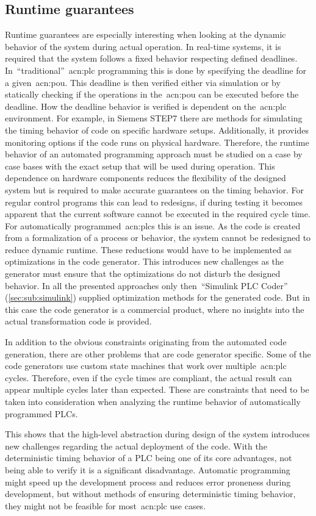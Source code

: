 \subsection{Runtime guarantees}
\label{sec:sub:rt}
Runtime guarantees are especially interesting when looking at the dynamic behavior of the system during actual operation.
In real-time systems, it is required that the system follows a fixed behavior respecting defined deadlines.
In~\enquote{traditional}~\acrshort{acn:plc} programming this is done by specifying the deadline for a given~\acrfull{acn:pou}.
This deadline is then verified either via simulation or by statically checking if the operations in the~\acrshort{acn:pou} can be executed before the deadline.
How the deadline behavior is verified is dependent on the~\acrshort{acn:plc} environment.
For example, in Siemens STEP7 there are methods for simulating the timing behavior of code on specific hardware setups.
Additionally, it provides monitoring options if the code runs on physical hardware.
Therefore, the runtime behavior of an automated programming approach must be studied on a case by case bases with the exact setup that will be used during operation.
This dependence on hardware components reduces the flexibility of the designed system but is required to make accurate guarantees on the timing behavior.
For regular control programs this can lead to redesigns, if during testing it becomes apparent that the current software cannot be executed in the required cycle time.
For automatically programmed~\acrshort{acn:plc}s this is an issue.
As the code is created from a formalization of a process or behavior, the system cannot be redesigned to reduce dynamic  runtime.
These reductions would have to be implemented as optimizations in the code generator.
This introduces new challenges as the generator must ensure that the optimizations do not disturb the designed behavior.
In all the presented approaches only then~\enquote{Simulink PLC Coder} (\ref{sec:sub:simulink}) supplied optimization methods for the generated code.
But in this case the code generator is a commercial product, where no insights into the actual transformation code is provided.

In addition to the obvious constraints originating from the automated code generation, there are other problems that are code generator specific.
Some of the code generators use custom state machines that work over multiple~\acrshort{acn:plc} cycles.
Therefore, even if the cycle times are compliant, the actual result can appear multiple cycles later than expected.
These are constraints that need to be taken into consideration when analyzing the runtime behavior of automatically programmed PLCs.

This shows that the high-level abstraction during design of the system introduces new challenges regarding the actual deployment of the code.
With the deterministic timing behavior of a PLC being one of its core advantages, not being able to verify it is a significant disadvantage.
Automatic programming might speed up the development process and reduces error proneness during development, but without methods of ensuring deterministic timing behavior, they might not be feasible for most~\acrshort{acn:plc} use cases.
